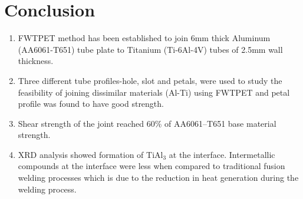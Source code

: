 \documentclass[3p]{elsarticle}
\begin{document}
\section{Conclusion}
\label{sec:Conclusion}
\begin{enumerate}[1.]
\item FWTPET method has been established to join 6mm thick Aluminum (AA6061-T651) tube plate to Titanium (Ti-6Al-4V) tubes of 2.5mm wall thickness.
\item Three different tube profiles-hole, slot and petals, were used to study the feasibility of joining dissimilar materials (Al-Ti) using FWTPET and petal profile was found to have good strength.
\item Shear strength of the joint reached 60\% of AA6061–T651 base material strength.
\item XRD analysis showed formation of TiAl$_{3}$ at the interface. Intermetallic compounds at the interface were less when compared to traditional fusion welding processes which is due to the reduction in heat generation during the welding process.
\end{enumerate}

\iffalse


\section{images}
\begin{figure}[!htbp]
\centering
\texttt{[image: images/welding-set-up.png]}
\caption{XRD - Plot}
\label{fig:xrd-plot}
\end{figure}

\begin{figure}[!htbp]
\centering
\texttt{[image: images/MicroStructure.png]}
\caption{XRD - Plot}
\label{fig:xrd-plot}
\end{figure}

\begin{figure}[!htbp]
\centering
\texttt{[image: images/MacroStructure.png]}
\caption{XRD - Plot}
\label{fig:xrd-plot}
\end{figure}

\begin{figure}[!htbp]
\centering
\texttt{[image: images/xrd.png]}
\caption{XRD - Plot}
\label{fig:xrd-plot}
\end{figure}




\fi


\end{document}
